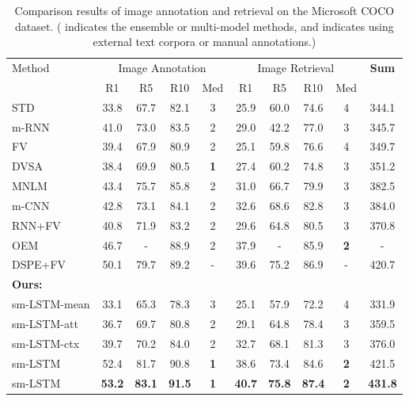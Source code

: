 \documentclass[10pt,twocolumn,letterpaper]{article}
\begin{document}
\begin{table*}[t] \small
\centering
\caption{Comparison results of image annotation and retrieval on the Microsoft COCO dataset. ( indicates the ensemble or multi-model methods,
and  indicates using external text corpora or manual annotations.)}
\begin{tabular}{l|cccc|cccc|c}
\hline
\hline
\multirow{2}{0.7cm}{Method}     &  \multicolumn{4}{c|}{Image Annotation}  &  \multicolumn{4}{c|}{Image Retrieval} & \multirow{2}{0.7cm}{\textbf{Sum}}  \\
\cline{2-9}
     & R1 & R5  & R10  & Med   & R1 & R5  & R10  & Med  &    \\
\hline
STD \cite{kiros2015skip} &33.8 &67.7 &82.1 &3 &25.9 &60.0 &74.6 &4 & 344.1\\
m-RNN \cite{mao2014explain}           &41.0 &73.0 &83.5 &{2} &29.0 &42.2 &77.0 &{3} & 345.7\\
FV \cite{klein2015associating}     &39.4 &67.9 &80.9 &{2} &25.1 &59.8 &76.6 &4 & 349.7\\
DVSA \cite{karpathy2014vsa}               &38.4 &69.9 &80.5 &\bf{1} &27.4 &60.2 &74.8 &{3} & 351.2\\
MNLM \cite{kiros2014unifying}        &43.4 &75.7 &85.8 &{2} &31.0 &66.7 &79.9 &{3} & 382.5\\
m-CNN \cite{ma2015multimodal}              &42.8 &73.1 &84.1 &{2} &32.6 &{68.6} &{82.8} &{3} & 384.0\\
RNN+FV \cite{lev2015rnn}          &40.8 &71.9 &83.2 &2 &29.6 &64.8 &80.5 &3 & 370.8\\
OEM \cite{vendrov2015order}       &46.7 &- &88.9 &2 &37.9 &- &85.9 &\bf{2} &-\\
DSPE+FV \cite{wang2015learning}       &50.1 &79.7 &89.2 &- &39.6 &75.2 &86.9 &- & 420.7\\


\hline
\bf{Ours}:      & & & & & & & &\\
\hspace{0mm} sm-LSTM-mean      &33.1 &65.3 &78.3 &3 &25.1 &57.9 &72.2 &4 &331.9 \\
\hspace{0mm} sm-LSTM-att      &36.7 &69.7 &80.8 &2 &{29.1} &{64.8} &{78.4} &3 &{359.5} \\
\hspace{0mm} sm-LSTM-ctx            &39.7 &70.2 &84.0 &2 &32.7 &68.1 &81.3 &3 &376.0\\
\hspace{0mm} sm-LSTM            &52.4 &81.7 &90.8 &\bf{1} &38.6 &73.4 &84.6 &\bf{2} &421.5\\
\hspace{0mm} sm-LSTM      &\bf{53.2} &\bf{83.1} &\bf{91.5} &\bf{1} &\bf{40.7} &\bf{75.8} &\bf{87.4} &\bf{2} & \bf{431.8}\\






\hline
\hline
\end{tabular}
\label{table:coco}
\end{table*}
\end{document}
